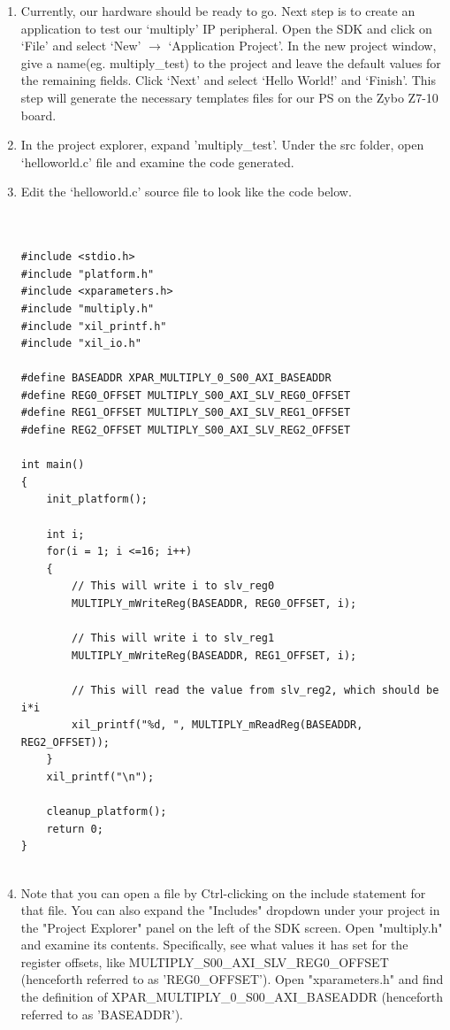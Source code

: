 \documentclass[11pt,twoside,titlepage]{article}
\begin{document}
\begin{enumerate}
	\item Currently, our hardware should be ready to go. Next step is to create an application to test our `multiply' IP peripheral. Open the SDK and click on `File' and select `New' $\rightarrow$ `Application Project'. In the new project window, give a name(eg. multiply\_test) to the project and leave the default values for the remaining fields. Click `Next' and select `Hello World!' and `Finish'. This step will generate the necessary templates files for our PS on the Zybo Z7-10 board. 
	\item In the project explorer, expand 'multiply\_test'. Under the src folder, open `helloworld.c' file and examine the code generated. 
	
	\item Edit the `helloworld.c' source file to look like the code below.
	
	\begin{lstlisting}
	
	
#include <stdio.h>
#include "platform.h"
#include <xparameters.h>
#include "multiply.h"
#include "xil_printf.h"
#include "xil_io.h"

#define BASEADDR XPAR_MULTIPLY_0_S00_AXI_BASEADDR
#define REG0_OFFSET MULTIPLY_S00_AXI_SLV_REG0_OFFSET
#define REG1_OFFSET MULTIPLY_S00_AXI_SLV_REG1_OFFSET
#define REG2_OFFSET MULTIPLY_S00_AXI_SLV_REG2_OFFSET

int main()
{
	init_platform();
	
	int i;
	for(i = 1; i <=16; i++)
	{
		// This will write i to slv_reg0
		MULTIPLY_mWriteReg(BASEADDR, REG0_OFFSET, i);
		
		// This will write i to slv_reg1
		MULTIPLY_mWriteReg(BASEADDR, REG1_OFFSET, i);
		
		// This will read the value from slv_reg2, which should be i*i
		xil_printf("%d, ", MULTIPLY_mReadReg(BASEADDR, REG2_OFFSET));
	}
	xil_printf("\n");
	
	cleanup_platform();
	return 0;
}
	
	\end{lstlisting}
	
	\item Note that you can open a file by Ctrl-clicking on the include statement for that file. You can also expand the "Includes" dropdown under your project in the "Project Explorer" panel on the left of the SDK screen. Open "multiply.h" and examine its contents. Specifically, see what values it has set for the register offsets, like MULTIPLY\_S00\_AXI\_SLV\_REG0\_OFFSET (henceforth referred to as 'REG0\_OFFSET'). Open "xparameters.h" and find the definition of XPAR\_MULTIPLY\_0\_S00\_AXI\_BASEADDR (henceforth referred to as 'BASEADDR').
	

\end{enumerate}
\end{document}
